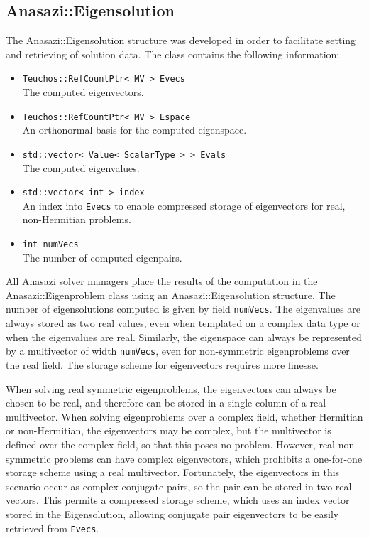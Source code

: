 \subsection{Anasazi::Eigensolution}
\label{sec:anasazi:eigensolution}

The Anasazi::Eigensolution structure was developed in order to facilitate setting
and retrieving of solution data. The class contains the following information:
\begin{itemize}
  \item \verb!Teuchos::RefCountPtr< MV > Evecs! \\ 
   The computed eigenvectors.
 \item \verb!Teuchos::RefCountPtr< MV > Espace! \\ 
   An orthonormal basis for the computed eigenspace.
 \item \verb!std::vector< Value< ScalarType > > Evals! \\ 
   The computed eigenvalues.
 \item \verb!std::vector< int > index! \\ 
   An index into \verb!Evecs! to enable compressed storage of eigenvectors for real, non-Hermitian problems.
 \item \verb!int numVecs! \\
   The number of computed eigenpairs.
\end{itemize}

All Anasazi solver managers place the results of the computation in the
Anasazi::Eigen\-problem class using an Anasazi::Eigensolution structure. The number of
eigensolutions computed is given by field \verb!numVecs!. The eigenvalues are
always stored as two real values, even when templated on a complex data type or when the eigenvalues
are real. Similarly, the eigenspace can always be represented by a multivector of width
\verb!numVecs!, even for non-symmetric eigenproblems over the real field. The storage
scheme for eigenvectors requires more finesse.

When solving real symmetric eigenproblems, the eigenvectors can always be chosen to be
real, and therefore can be stored in a single column of a real multivector. When solving
eigenproblems over a complex field, whether Hermitian or non-Hermitian, the eigenvectors
may be complex, but the multivector is defined over the complex field, so that this poses
no problem. However, real non-symmetric problems can have complex eigenvectors, which
prohibits a one-for-one storage scheme using a real multivector.  Fortunately, the
eigenvectors in this scenario occur as complex conjugate pairs, so the pair can be stored
in two real vectors. This permits a compressed storage scheme, which uses an index vector
stored in the Eigensolution, allowing conjugate pair eigenvectors to be easily retrieved
from \verb!Evecs!. 


